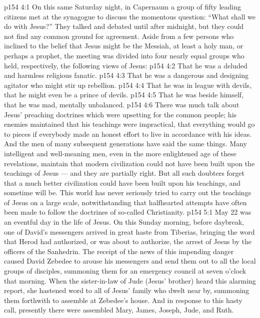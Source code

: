 \vs p154 4:1 On this same Saturday night, in Capernaum a group of fifty leading citizens met at the synagogue to discuss the momentous question: “What shall we do with Jesus?” They talked and debated until after midnight, but they could not find any common ground for agreement. Aside from a few persons who inclined to the belief that Jesus might be the Messiah, at least a holy man, or perhaps a prophet, the meeting was divided into four nearly equal groups who held, respectively, the following views of Jesus:
\vs p154 4:2 \bibnobreakspace That he was a deluded and harmless religious fanatic.
\vs p154 4:3 \bibnobreakspace That he was a dangerous and designing agitator who might stir up rebellion.
\vs p154 4:4 \bibnobreakspace That he was in league with devils, that he might even be a prince of devils.
\vs p154 4:5 \bibnobreakspace That he was beside himself, that he was mad, mentally unbalanced.
\vs p154 4:6 \pc There was much talk about Jesus’ preaching doctrines which were upsetting for the common people; his enemies maintained that his teachings were impractical, that everything would go to pieces if everybody made an honest effort to live in accordance with his ideas. And the men of many subsequent generations have said the same things. Many intelligent and well\hyp{}meaning men, even in the more enlightened age of these revelations, maintain that modern civilization could not have been built upon the teachings of Jesus --- and they are partially right. But all such doubters forget that a much better civilization could have been built upon his teachings, and sometime will be. This world has never seriously tried to carry out the teachings of Jesus on a large scale, notwithstanding that halfhearted attempts have often been made to follow the doctrines of so\hyp{}called Christianity.
\vs p154 5:1 May 22 was an eventful day in the life of Jesus. On this Sunday morning, before daybreak, one of David’s messengers arrived in great haste from Tiberias, bringing the word that Herod had authorized, or was about to authorize, the arrest of Jesus by the officers of the Sanhedrin. The receipt of the news of this impending danger caused David Zebedee to arouse his messengers and send them out to all the local groups of disciples, summoning them for an emergency council at seven o’clock that morning. When the sister\hyp{}in\hyp{}law of Jude (Jesus’ brother) heard this alarming report, she hastened word to all of Jesus’ family who dwelt near by, summoning them forthwith to assemble at Zebedee’s house. And in response to this hasty call, presently there were assembled Mary, James, Joseph, Jude, and Ruth.
